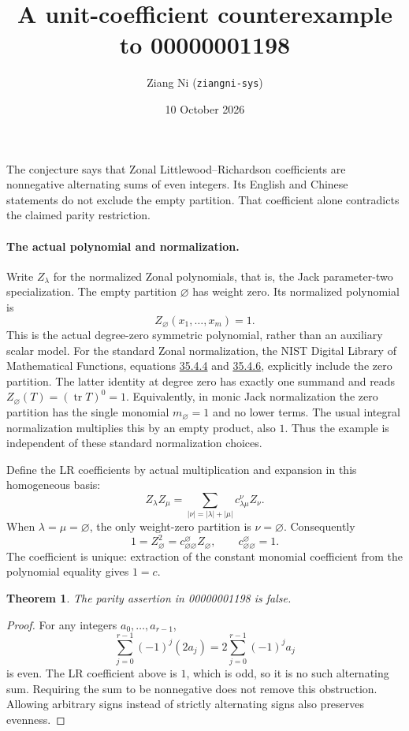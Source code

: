 \documentclass[11pt]{article}
\title{A unit-coefficient counterexample to 00000001198}
\author{Ziang Ni (\texttt{ziangni-sys})}
\date{10 October 2026}
\newtheorem{theorem}{Theorem}
\begin{document}
\maketitle
The conjecture says that Zonal Littlewood--Richardson coefficients are
nonnegative alternating sums of even integers. Its English and Chinese
statements do not exclude the empty partition. That coefficient alone
contradicts the claimed parity restriction.

\paragraph{The actual polynomial and normalization.}
Write $Z_\lambda$ for the normalized Zonal polynomials, that is, the
Jack parameter-two specialization. The empty partition $\varnothing$
has weight zero. Its normalized polynomial is
\[
 Z_\varnothing(x_1,\ldots,x_m)=1.
\]
This is the actual degree-zero symmetric polynomial, rather than an
auxiliary scalar model. For the standard Zonal normalization, the
NIST Digital Library of Mathematical Functions, equations
\href{https://dlmf.nist.gov/35.4.E4}{35.4.4} and
\href{https://dlmf.nist.gov/35.4.E6}{35.4.6}, explicitly include the zero
partition. The latter identity at degree zero has exactly one summand
and reads $Z_\varnothing(T)=(\operatorname{tr}T)^0=1$.
Equivalently, in monic Jack normalization the zero partition has the
single monomial $m_\varnothing=1$ and no lower terms. The usual integral
normalization multiplies this by an empty product, also $1$.
Thus the example is independent of these standard normalization choices.

Define the LR coefficients by actual multiplication and expansion in
this homogeneous basis:
\[
 Z_\lambda Z_\mu
   =\sum_{|\nu|=|\lambda|+|\mu|}c_{\lambda\mu}^{\nu}Z_\nu.
\]
When $\lambda=\mu=\varnothing$, the only weight-zero partition is
$\nu=\varnothing$. Consequently
\[
 1=Z_\varnothing^2=c_{\varnothing\varnothing}^{\varnothing}
 Z_\varnothing,
 \qquad c_{\varnothing\varnothing}^{\varnothing}=1.
\]
The coefficient is unique: extraction of the constant monomial
coefficient from the polynomial equality gives $1=c$.

\begin{theorem}
The parity assertion in 00000001198 is false.
\end{theorem}
\begin{proof}
For any integers $a_0,\ldots,a_{r-1}$,
\[
 \sum_{j=0}^{r-1}(-1)^j(2a_j)
 =2\sum_{j=0}^{r-1}(-1)^ja_j
\]
is even. The LR coefficient above is $1$, which is odd, so it is no
such alternating sum. Requiring the sum to be nonnegative does not
remove this obstruction. Allowing arbitrary signs instead of strictly
alternating signs also preserves evenness.
\end{proof}
\end{document}
